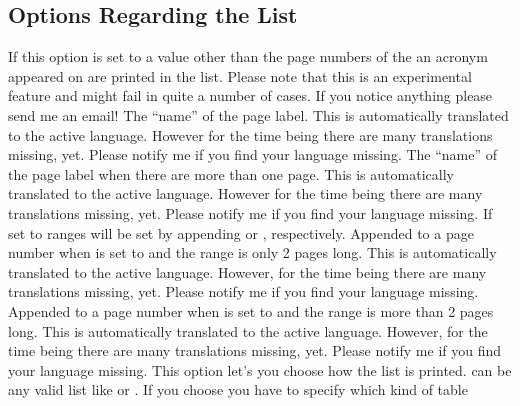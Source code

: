 \documentclass[DIV10,toc=index,toc=bib,hyperfootnotes=false]{cnpkgdoc}
\makeatletter
\newcommand*\sinceversion[1]{%
  \@bsphack
  \marginnote{%
    \footnotesize\sffamily\RaggedRight
    \textcolor{black!75}{Introduced in version~#1}}%
  \@esphack}
\makeatother
\begin{document}
\subsection{Options Regarding the List}
\begin{beschreibung}
   If this option is set to a value other than  the page numbers of
   the an acronym appeared on are printed in the list. Please note that this
   is an experimental feature and might fail in quite a number of cases. If you
   notice anything please send me an email!
   The ``name'' of the page label. This is automatically translated to the
   active language. However for the time being there are many translations
   missing, yet. Please notify me if you find your language missing.
   \sinceversion{1.0}The ``name'' of the page label when there are more than one
   page. This is automatically translated to the active language. However for the
   time being there are many translations missing, yet. Please notify me if you
   find your language missing.
   \sinceversion{1.0}If set to  ranges will be set by appending
    or , respectively.
   \sinceversion{1.0}Appended to a page number when  is set to
    and the range is only 2 pages long. This is automatically
   translated to the active language. However, for the time being there are many
   translations missing, yet. Please notify me if you find your language missing.
   \sinceversion{1.0}Appended to a page number when  is set to
    and the range is more than 2 pages long. This is automatically
   translated to the active language. However, for the time being there are many
   translations missing, yet. Please notify me if you find your language missing.
   This option let's you choose how the list is printed.  can be any
   valid list like
  or .
   If you choose  you have to specify which kind of table

\end{beschreibung}
\end{document}
